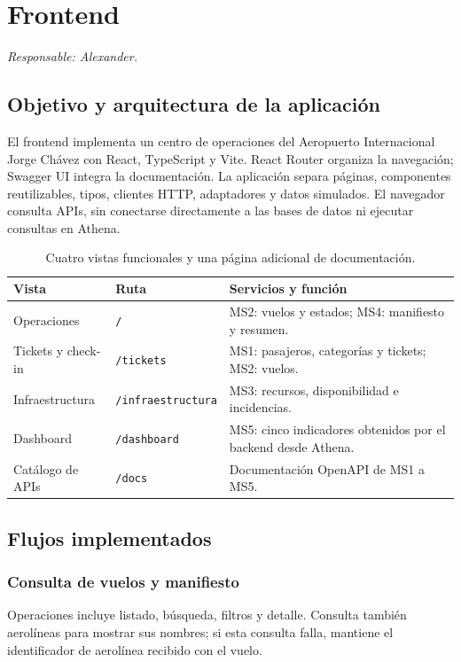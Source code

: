 \section{Frontend}
\label{sec:frontend}
\textit{Responsable: Alexander.}

\subsection{Objetivo y arquitectura de la aplicación}
El frontend implementa un centro de operaciones del Aeropuerto Internacional
Jorge Chávez con React, TypeScript y Vite. React Router organiza la navegación;
Swagger UI integra la documentación. La aplicación separa páginas, componentes
reutilizables, tipos, clientes HTTP, adaptadores y datos simulados.
El navegador consulta APIs, sin conectarse directamente a las bases de datos
ni ejecutar consultas en Athena.

\begin{table}[htbp]
\centering\small
\begin{tabularx}{\textwidth}{p{}p{}X}
\toprule
Vista & Ruta & Servicios y función \\
\midrule
Operaciones & \texttt{/} & MS2: vuelos y estados; MS4: manifiesto y resumen. \\
Tickets y check-in & \texttt{/tickets} & MS1: pasajeros, categorías y tickets; MS2: vuelos. \\
Infraestructura & \texttt{/infraestructura} & MS3: recursos, disponibilidad e incidencias. \\
Dashboard & \texttt{/dashboard} & MS5: cinco indicadores obtenidos por el backend desde Athena. \\
Catálogo de APIs & \texttt{/docs} & Documentación OpenAPI de MS1 a MS5. \\
\bottomrule
\end{tabularx}
\caption{Cuatro vistas funcionales y una página adicional de documentación.}
\end{table}

\subsection{Flujos implementados}
\subsubsection{Consulta de vuelos y manifiesto}
Operaciones incluye listado, búsqueda, filtros y detalle. Consulta también
aerolíneas para mostrar sus nombres; si esta consulta falla, mantiene el
identificador de aerolínea recibido con el vuelo.

